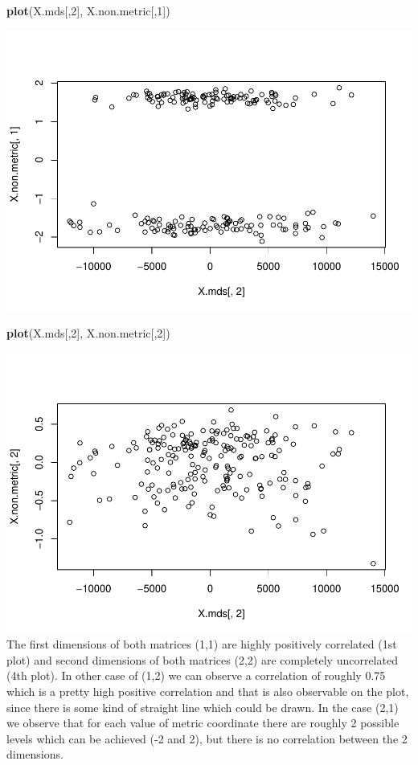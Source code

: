 \documentclass[
]{article}
\newenvironment{Shaded}{\begin{snugshade}}{\end{snugshade}}
\newcommand{\DecValTok}[1]{\textcolor[rgb]{0.00,0.00,0.81}{#1}}
\newcommand{\KeywordTok}[1]{\textcolor[rgb]{0.13,0.29,0.53}{\textbf{#1}}}
\newcommand{\NormalTok}[1]{#1}
\begin{document}
\begin{Shaded}
\begin{Highlighting}[]
\KeywordTok{plot}\NormalTok{(X.mds[,}\DecValTok{2}\NormalTok{], X.non.metric[,}\DecValTok{1}\NormalTok{])}
\end{Highlighting}
\end{Shaded}

\includegraphics{P052020_Substructure_files/figure-latex/13th-3.pdf}

\begin{Shaded}
\begin{Highlighting}[]
\KeywordTok{plot}\NormalTok{(X.mds[,}\DecValTok{2}\NormalTok{], X.non.metric[,}\DecValTok{2}\NormalTok{])}
\end{Highlighting}
\end{Shaded}

\includegraphics{P052020_Substructure_files/figure-latex/13th-4.pdf} The
first dimensions of both matrices (1,1) are highly positively correlated
(1st plot) and second dimensions of both matrices (2,2) are completely
uncorrelated (4th plot). In other case of (1,2) we can observe a
correlation of roughly 0.75 which is a pretty high positive correlation
and that is also observable on the plot, since there is some kind of
straight line which could be drawn. In the case (2,1) we observe that
for each value of metric coordinate there are roughly 2 possible levels
which can be achieved (-2 and 2), but there is no correlation between
the 2 dimensions.
\end{document}
